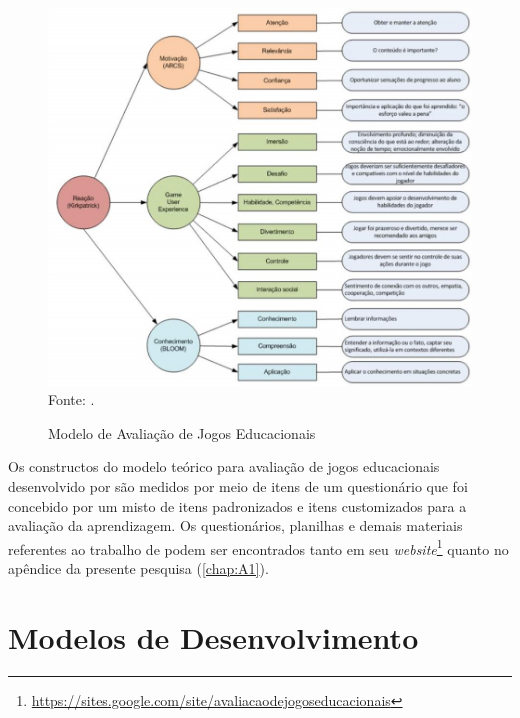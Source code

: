 \pagebreak

\begin{figure}[h]
	\centering
	\caption{Modelo de Avaliação de Jogos Educacionais}
	\includegraphics[width=1.0\textwidth]{Figuras/Savi.jpg}
	\label{fig:saaviw}\\
	Fonte: .
\end{figure}


Os constructos do modelo teórico para avaliação de jogos educacionais desenvolvido por  são medidos por meio de itens de um questionário que foi concebido por um misto de itens padronizados e itens customizados para a avaliação da aprendizagem. Os questionários, planilhas e demais materiais referentes ao trabalho de  podem ser encontrados tanto em seu \textit{website}\footnote{\url{https://sites.google.com/site/avaliacaodejogoseducacionais}} quanto no apêndice da presente pesquisa (\autoref{chap:A1}).

\newpage


\section{Modelos de Desenvolvimento}\label{sec:Avaliativos}

